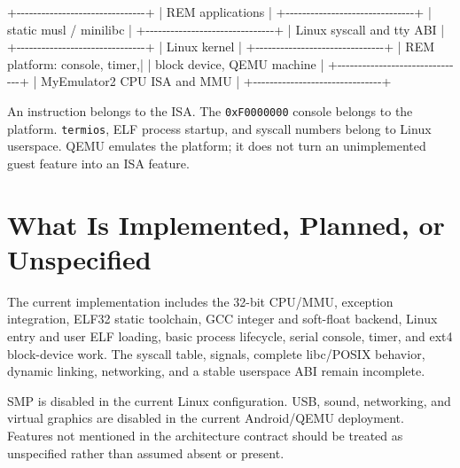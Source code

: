 \documentclass[
  oneside,
  openany]{book}
\newenvironment{Shaded}{\begin{snugshade}}{\end{snugshade}}
\newcommand{\NormalTok}[1]{#1}
\begin{document}
\begin{Shaded}
\begin{Highlighting}[]
\NormalTok{+{-}{-}{-}{-}{-}{-}{-}{-}{-}{-}{-}{-}{-}{-}{-}{-}{-}{-}{-}{-}{-}{-}{-}{-}{-}{-}{-}{-}{-}{-}{-}+}
\NormalTok{| REM applications              |}
\NormalTok{+{-}{-}{-}{-}{-}{-}{-}{-}{-}{-}{-}{-}{-}{-}{-}{-}{-}{-}{-}{-}{-}{-}{-}{-}{-}{-}{-}{-}{-}{-}{-}+}
\NormalTok{| static musl / minilibc        |}
\NormalTok{+{-}{-}{-}{-}{-}{-}{-}{-}{-}{-}{-}{-}{-}{-}{-}{-}{-}{-}{-}{-}{-}{-}{-}{-}{-}{-}{-}{-}{-}{-}{-}+}
\NormalTok{| Linux syscall and tty ABI     |}
\NormalTok{+{-}{-}{-}{-}{-}{-}{-}{-}{-}{-}{-}{-}{-}{-}{-}{-}{-}{-}{-}{-}{-}{-}{-}{-}{-}{-}{-}{-}{-}{-}{-}+}
\NormalTok{| Linux kernel                  |}
\NormalTok{+{-}{-}{-}{-}{-}{-}{-}{-}{-}{-}{-}{-}{-}{-}{-}{-}{-}{-}{-}{-}{-}{-}{-}{-}{-}{-}{-}{-}{-}{-}{-}+}
\NormalTok{| REM platform: console, timer,|}
\NormalTok{| block device, QEMU machine    |}
\NormalTok{+{-}{-}{-}{-}{-}{-}{-}{-}{-}{-}{-}{-}{-}{-}{-}{-}{-}{-}{-}{-}{-}{-}{-}{-}{-}{-}{-}{-}{-}{-}{-}+}
\NormalTok{| MyEmulator2 CPU ISA and MMU   |}
\NormalTok{+{-}{-}{-}{-}{-}{-}{-}{-}{-}{-}{-}{-}{-}{-}{-}{-}{-}{-}{-}{-}{-}{-}{-}{-}{-}{-}{-}{-}{-}{-}{-}+}
\end{Highlighting}
\end{Shaded}

An instruction belongs to the ISA. The \texttt{0xF0000000} console
belongs to the platform. \texttt{termios}, ELF process startup, and
syscall numbers belong to Linux userspace. QEMU emulates the platform;
it does not turn an unimplemented guest feature into an ISA feature.

\hypertarget{what-is-implemented-planned-or-unspecified}{%
\chapter{What Is Implemented, Planned, or
Unspecified}\label{what-is-implemented-planned-or-unspecified}}

The current implementation includes the 32-bit CPU/MMU, exception
integration, ELF32 static toolchain, GCC integer and soft-float backend,
Linux entry and user ELF loading, basic process lifecycle, serial
console, timer, and ext4 block-device work. The syscall table, signals,
complete libc/POSIX behavior, dynamic linking, networking, and a stable
userspace ABI remain incomplete.

SMP is disabled in the current Linux configuration. USB, sound,
networking, and virtual graphics are disabled in the current
Android/QEMU deployment. Features not mentioned in the architecture
contract should be treated as unspecified rather than assumed absent or
present.
\end{document}
